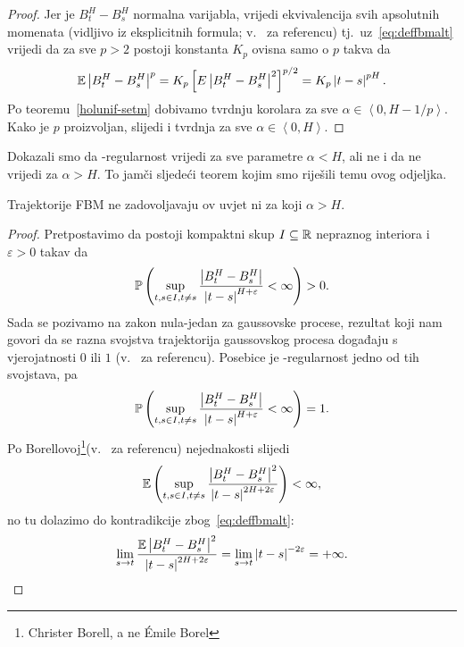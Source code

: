 \documentclass[main.tex]{subfiles}
\begin{document}
\begin{proof}
	Jer je \( B^H_t-B^H_s \) normalna varijabla, vrijedi ekvivalencija svih
	apsolutnih momenata (vidljivo iz eksplicitnih formula; v.~\cite[str.~16]{ayache} za referencu) tj.\
	uz~\eqref{eq:deffbmalt} vrijedi da
	za sve \( p > 2 \) postoji konstanta \( K_p \) ovisna samo o \( p \) takva da
	\begin{equation}
		\mathbb{E} \left| {B^H_t-B^H_s} \right|^p = K_p \left[ E \left| {B^H_t-B^H_s} \right|^2 \right] ^{p/2} = K_p \left| {t-s} \right|^{pH}.
	\end{equation}
	Po teoremu~\ref{holunif-setm} dobivamo tvrdnju korolara
	za sve \( \alpha \in \left\langle 0,H-1/p  \right\rangle  \). Kako je \( p \)
	proizvoljan, slijedi i tvrdnja za sve \( \alpha \in \left\langle 0,H \right\rangle \).
\end{proof}

Dokazali smo da \holder -regularnost vrijedi za sve parametre \( \alpha < H \),
ali ne i da ne vrijedi za \( \alpha > H \). To jamči sljedeći teorem
kojim smo riješili temu ovog odjeljka.

\begin{teorem}\label{holunif-prop>}
	Trajektorije FBM ne zadovoljavaju \holder ov uvjet ni za koji \( \alpha > H \).
\end{teorem}

\begin{proof}
	Pretpostavimo da postoji kompaktni skup \( I \subseteq \mathbb{R} \)
	nepraznog interiora i \( \varepsilon > 0 \) takav da
	\begin{equation}
		\mathbb{P}\left( \sup\limits_{t,s \in I, t\neq s} \frac{\left| {B^H_t-B^H_s} \right|}{\left| {t-s} \right|^{H+\varepsilon}} < \infty \right) > 0.
	\end{equation}
	Sada se pozivamo na zakon nula-jedan za gaussovske procese, rezultat koji nam govori da se razna svojstva
	trajektorija gaussovskog procesa događaju s vjerojatnosti \( 0 \) ili \( 1 \) (v.~\cite[prop.~3.7]{ayache} za referencu).
	Posebice je \holder -regularnost jedno od tih svojstava, pa
	\begin{equation}
		\mathbb{P} \left( \sup\limits_{t,s \in I, t\neq s} \frac{\left| {B^H_t-B^H_s} \right|}{\left| {t-s} \right|^{H+\varepsilon}} < \infty  \right) = 1.
	\end{equation}
	Po Borellovoj\footnote{Christer Borell, a ne \'Emile Borel}(v.~\cite[prop.~3.7]{ayache} za referencu) nejednakosti slijedi
	\begin{equation}
		\mathbb{E} \left( \sup_{t,s \in I, t\neq s} \frac{\left| {B^H_t-B^H_s} \right|^2}{\left| {t-s} \right|^{2H+2\varepsilon}} \right) < \infty,
	\end{equation}
	no tu dolazimo do kontradikcije zbog~\eqref{eq:deffbmalt}:
	\begin{equation}
		\lim_{s \rightarrow t} \frac{\mathbb{E} \left| {B^H_t-B^H_s} \right|^2}{\left| {t-s} \right|^{2H+2\varepsilon}} = \lim_{s \rightarrow t} \left| {t-s} \right|^{-2\varepsilon} = +\infty.
	\end{equation}
\end{proof}
\end{document}
